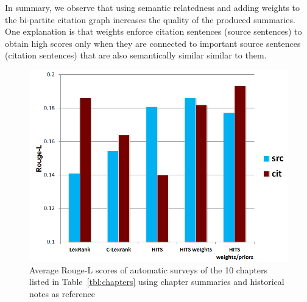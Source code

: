 In summary, we observe that using semantic relatedness and adding weights to the bi-partite citation graph increases the quality of the produced summaries. One explanation is that weights enforce citation sentences (source sentences) to obtain high scores only when they are connected to important source sentences (citation sentences) that are also semantically similar  similar to them. 

\begin{figure}
\centering
\includegraphics[width=\columnwidth]{images/rougel-2}
\caption{Average Rouge-L scores of automatic surveys of the 10 chapters listed in Table~\ref{tbl:chapters}  using chapter summaries and historical notes as reference }\label{fig:rougel}
\end{figure}


